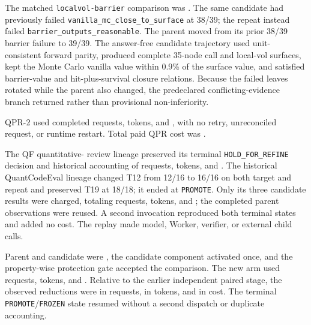  The matched \texttt{localvol-barrier} comparison was
\QPRTwoProtection{}. The same candidate had previously failed
\texttt{vanilla\_mc\_close\_to\_surface} at 38/39; the repeat instead failed
\texttt{barrier\_outputs\_reasonable}. The parent moved from its prior 38/39
barrier failure to 39/39. The answer-free candidate trajectory used unit-
consistent forward parity, produced complete 35-node call and local-vol
surfaces, kept the Monte Carlo vanilla value within 0.9\% of the surface value,
and satisfied barrier-value and hit-plus-survival closure relations. Because
the failed leaves rotated while the parent also changed, the predeclared
conflicting-evidence branch returned \QPRTwoStatus{} rather than provisional
non-inferiority.

QPR-2 used \QPRTwoRequests{} completed requests, \QPRTwoTokens{} tokens, and
\QPRTwoCost{}, with no retry, unreconciled request, or runtime restart. Total
paid QPR cost was \QPRTotalCost{}. 

 The QF quantitative-
review lineage preserved its terminal \texttt{HOLD\_FOR\_REFINE} decision and
historical accounting of \CrossBenchmarkQFRequests{} requests,
\CrossBenchmarkQFTokens{} tokens, and \CrossBenchmarkQFCost{}. The historical
QuantCodeEval lineage changed T12 from 12/16 to 16/16 on both target and repeat
and preserved T19 at 18/18; it ended at \texttt{PROMOTE}. Only its three
candidate results were charged, totaling \CrossBenchmarkQCERequests{}
requests, \CrossBenchmarkQCETokens{} tokens, and
\CrossBenchmarkQCECost{}; the completed parent observations were reused. A
second invocation reproduced both terminal states and added no cost. The
replay made \CrossBenchmarkReplayNewCalls{} model, Worker, verifier, or
external child calls.

Parent and candidate were \ParentReuseProtection{}, the candidate component
activated once, and the property-wise protection gate accepted the comparison.
The new arm used \ParentReuseRequests{} requests, \ParentReuseTokens{} tokens,
and \ParentReuseCost{}. Relative to the earlier independent paired stage, the
observed reductions were \ParentReuseRequestReduction{} in requests,
\ParentReuseTokenReduction{} in tokens, and \ParentReuseCostReduction{} in
cost. The terminal \texttt{PROMOTE}/\texttt{FROZEN} state resumed without a
second dispatch or duplicate accounting.

